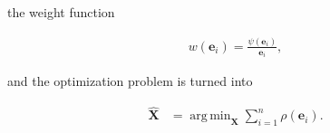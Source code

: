 \documentclass[12pt]{article}
\DeclareMathOperator*{\argmin}{arg\,min}
\begin{document}
    \noindent the weight function

    \begin{equation}\label{eqn:bzimv}
      \begin{aligned}
      w(\mathbf{e}_i) = \frac{\psi(\mathbf{e}_i)}{\mathbf{e}_i},
      \end{aligned}
    \end{equation}

    \noindent and the optimization problem is turned into

    \begin{equation}\label{eqn:bzmin}
      \begin{aligned}
        \mathbf{\hat{X}} &=
          \argmin_{\mathbf{X}}\sum_{i=1}^n \rho(\mathbf{e}_i).
      \end{aligned}
    \end{equation}
\end{document}

